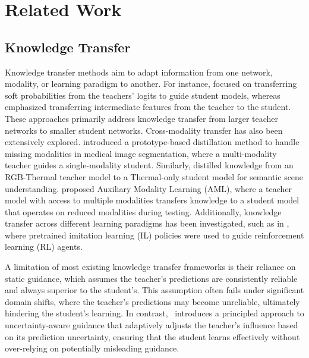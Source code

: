 \section{Related Work}
\subsection{Knowledge Transfer}
\vspace{-5pt}
Knowledge transfer methods aim to adapt information from one network, modality, or learning paradigm to another. For instance, \citet{hinton2015distilling, jin2023multi, sun2024logit} focused on transferring soft probabilities from the teachers' logits to guide student models, whereas \citet{romero2014fitnets, zagoruyko2016paying, passalis2018learning, kim2018paraphrasing} emphasized transferring intermediate features from the teacher to the student. These approaches primarily address knowledge transfer from larger teacher networks to smaller student networks. Cross-modality transfer has also been extensively explored. \citet{wang2023prototype} introduced a prototype-based distillation method to handle missing modalities in medical image segmentation, where a multi-modality teacher guides a single-modality student. Similarly, \citet{feng2023cekd} distilled knowledge from an RGB-Thermal teacher model to a Thermal-only student model for semantic scene understanding.  \citet{shen2023auxiliary} proposed Auxiliary Modality Learning (AML), where a teacher model with access to multiple modalities transfers knowledge to a student model that operates on reduced modalities during testing. Additionally, knowledge transfer across different learning paradigms has been investigated, such as in \cite{hu2023imitation, bhaskar2024planrl}, where pretrained imitation learning (IL) policies were used to guide reinforcement learning (RL) agents. 

A limitation of most existing knowledge transfer frameworks is their reliance on static guidance, which assumes the teacher’s predictions are consistently reliable and always superior to the student’s. This assumption often fails under significant domain shifts, where the teacher’s predictions may become unreliable, ultimately hindering the student’s learning. In contrast, \ours~introduces a principled approach to uncertainty-aware guidance that adaptively adjusts the teacher's influence based on its prediction uncertainty, ensuring that the student learns effectively without over-relying on potentially misleading guidance.


